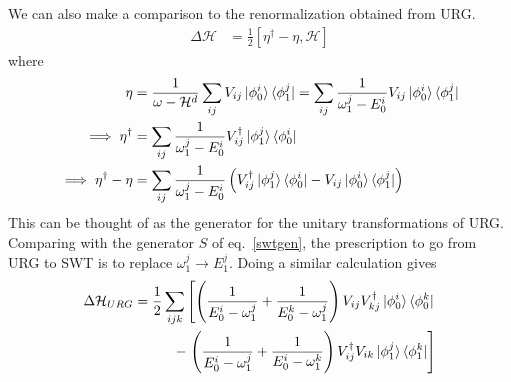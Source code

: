 \documentclass[twoside]{report}
\numberwithin{equation}{section}
\begin{document}
\\\\We can also make a comparison to the renormalization obtained from URG.
\begin{equation}\begin{aligned}
	\Delta \mathcal{H} &= \frac{1}{2}\left[\eta^\dagger - \eta,\mathcal{H}\right]
\end{aligned}\end{equation}
where 
\begin{equation}\begin{aligned}
\eta &= \frac{1}{\omega - \mathcal{H}^d}\sum_{ij}V_{ij}\ket{\phi_0^i}\bra{\phi_1^j} = \sum_{ij}\frac{1}{\omega_1^j - E_0^i}V_{ij}\ket{\phi_0^i}\bra{\phi_1^j}\\
\implies \eta^\dagger &= \sum_{ij}\frac{1}{\omega_1^j - E_0^i}V^\dagger_{ij}\ket{\phi_1^j}\bra{\phi_0^i}\\
\implies \eta^\dagger - \eta &= \sum_{ij}\frac{1}{\omega_1^j - E_0^i}\left(V^\dagger_{ij}\ket{\phi_1^j}\bra{\phi_0^i} - V_{ij}\ket{\phi_0^i}\bra{\phi_1^j}\right)\\
\end{aligned}\end{equation}
This can be thought of as the generator for the unitary transformations of URG. Comparing with the generator \(S\) of eq.~\ref{swtgen}, the prescription to go from URG to SWT is to replace \(\omega_1^j \to E_1^j\). Doing a similar calculation gives
\begin{equation}\begin{aligned}
	\Delta \mathcal{H}_{URG} = \frac{1}{2} \sum_{ijk}\left[\left(\frac{1}{E_0^i - \omega_1^j} + \frac{1}{E_0^k - \omega_1^j}\right)V_{ij}V^\dagger_{kj}\ket{\phi_0^i}\bra{\phi_0^k}\right.\\
	- \left.\left(\frac{1}{E_0^i - \omega_1^j} + \frac{1}{E_0^i - \omega_1^k}\right)V^\dagger_{ij}V_{ik}\ket{\phi_1^j}\bra{\phi_1^k}\right]\\
\end{aligned}\end{equation}
\end{document}
